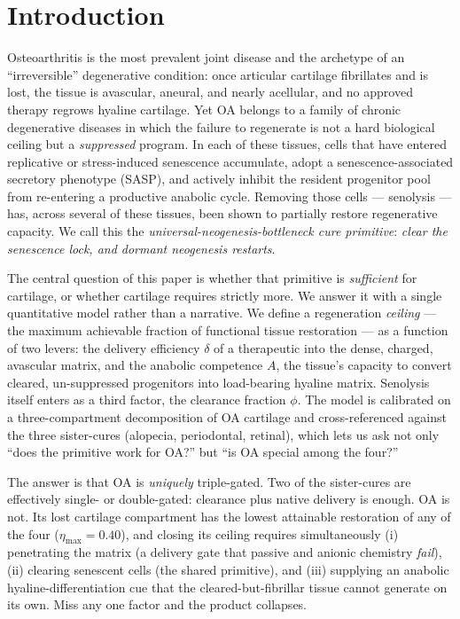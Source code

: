 \documentclass[11pt,a4paper]{article}
\begin{document}
\section{Introduction}

Osteoarthritis is the most prevalent joint disease and the archetype of an
``irreversible'' degenerative condition: once articular cartilage fibrillates and
is lost, the tissue is avascular, aneural, and nearly acellular, and no approved
therapy regrows hyaline cartilage. Yet OA belongs to a family of chronic
degenerative diseases in which the failure to regenerate is not a hard biological
ceiling but a \emph{suppressed} program. In each of these tissues, cells that have
entered replicative or stress-induced senescence accumulate, adopt a
senescence-associated secretory phenotype (SASP), and actively inhibit the
resident progenitor pool from re-entering a productive anabolic cycle. Removing
those cells --- senolysis --- has, across several of these tissues, been shown to
partially restore regenerative capacity. We call this the
\emph{universal-neogenesis-bottleneck cure primitive}: \emph{clear the
senescence lock, and dormant neogenesis restarts}.

The central question of this paper is whether that primitive is \emph{sufficient}
for cartilage, or whether cartilage requires strictly more. We answer it with a
single quantitative model rather than a narrative. We define a regeneration
\emph{ceiling} --- the maximum achievable fraction of functional tissue
restoration --- as a function of two levers: the delivery efficiency $\delta$ of
a therapeutic into the dense, charged, avascular matrix, and the anabolic
competence $A$, the tissue's capacity to convert cleared, un-suppressed
progenitors into load-bearing hyaline matrix. Senolysis itself enters as a third
factor, the clearance fraction $\phi$. The model is calibrated on a
three-compartment decomposition of OA cartilage and cross-referenced against the
three sister-cures (alopecia, periodontal, retinal), which lets us ask not only
``does the primitive work for OA?'' but ``is OA special among the four?''

The answer is that OA is \emph{uniquely} triple-gated. Two of the sister-cures
are effectively single- or double-gated: clearance plus native delivery is
enough. OA is not. Its lost cartilage compartment has the lowest attainable
restoration of any of the four ($\eta_{\max}=0.40$), and closing its ceiling
requires simultaneously (i) penetrating the matrix (a delivery gate that passive
and anionic chemistry \emph{fail}), (ii) clearing senescent cells (the shared
primitive), and (iii) supplying an anabolic hyaline-differentiation cue that the
cleared-but-fibrillar tissue cannot generate on its own. Miss any one factor and
the product collapses.
\end{document}
